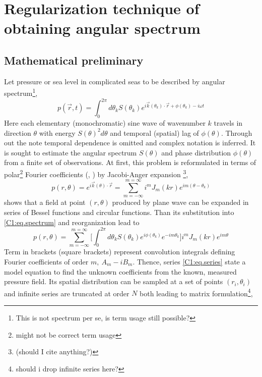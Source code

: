 \section{Regularization technique of obtaining angular spectrum}
\subsection{Mathematical preliminary}
Let pressure or sea level in complicated seas to be described by angular spectrum\footnote{This is not spectrum per se, is term usage still possible?},
\begin{equation}
\label{C1:eq.spectrum}
p(\vec{r}, t) = \int_0^{2\pi}  d\theta_k S(\theta_k) e^{i \vec{k}(\theta_k) \cdot \vec{r} + \phi(\theta_k) - i \omega t}
\end{equation}
Here each elementary (monochromatic) sine wave of wavenumber $k$ travels in direction $\theta$ with energy $S(\theta)^2 d\theta$ and temporal (spatial) lag of $\phi(\theta)$. Through out the note temporal dependence is omitted and complex notation is inferred. It is sought to estimate the angular spectrum $S(\theta)$ and phase distribution $\phi(\theta)$ from a finite set of observations. At first, this problem is reformulated in terms of polar\footnote{might not be correct term usage} Fourier coefficients (\cite{benoit1997analysing}, \cite{rafaely2004plane}) by Jacobi-Anger expansion \footnote{(should I cite anything?)},
\begin{equation}
p(r, \theta) = e^{i \vec{k}(\theta) \cdot \vec{r}} = \sum_{m = -\infty}^{m = \infty} i^{m} J_{m}(k r) e^{im(\theta - \theta_k)}
\end{equation}
shows that a field at point $(r, \theta)$ produced by plane wave can be expanded in series of Bessel functions and circular functions. Than its substitution into \eqref{C1:eq.spectrum} and reorganization lead to
\begin{equation}
\label{C1:eq.series}
p(r, \theta) = \sum_{m=-\infty}^{m=\infty} \big[ \int_0^{2\pi}  d\theta_k S(\theta_k) e^{i\phi(\theta_k)} e^{-im\theta_k} \big] i^m J_m(kr) e^{im\theta}
\end{equation}
Term in brackets (square brackets) represent convolution integrals defining Fourier coefficients of order $m,~A_m - i B_m$. Thence, series \eqref{C1:eq.series} state a model equation to find the unknown coefficients from the known, measured pressure field. Its spatial distribution can be sampled at a set of points $(r_i, \theta_i)$ and infinite series are truncated at order $N$ both leading to matrix formulation\footnote{should i drop infinite series here?},
